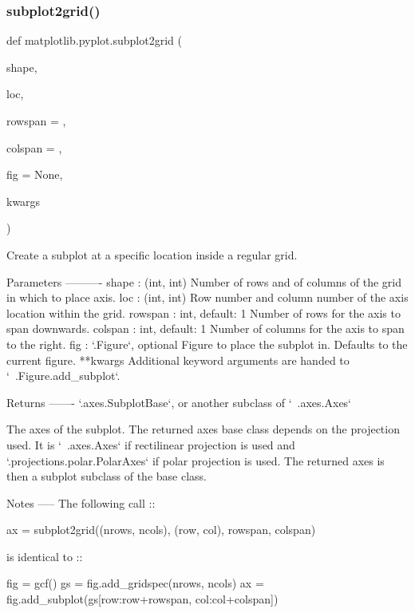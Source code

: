 \subsubsection{\texorpdfstring{subplot2grid()}{subplot2grid()}}
{\footnotesize\ttfamily def matplotlib.\+pyplot.\+subplot2grid (\begin{DoxyParamCaption}\item[{}]{shape,  }\item[{}]{loc,  }\item[{}]{rowspan = {},  }\item[{}]{colspan = {},  }\item[{}]{fig = {\ttfamily None},  }\item[{}]{kwargs }\end{DoxyParamCaption})}

\begin{DoxyVerb}Create a subplot at a specific location inside a regular grid.

Parameters
----------
shape : (int, int)
    Number of rows and of columns of the grid in which to place axis.
loc : (int, int)
    Row number and column number of the axis location within the grid.
rowspan : int, default: 1
    Number of rows for the axis to span downwards.
colspan : int, default: 1
    Number of columns for the axis to span to the right.
fig : `.Figure`, optional
    Figure to place the subplot in. Defaults to the current figure.
**kwargs
    Additional keyword arguments are handed to `~.Figure.add_subplot`.

Returns
-------
`.axes.SubplotBase`, or another subclass of `~.axes.Axes`

    The axes of the subplot.  The returned axes base class depends on the
    projection used.  It is `~.axes.Axes` if rectilinear projection is used
    and `.projections.polar.PolarAxes` if polar projection is used.  The
    returned axes is then a subplot subclass of the base class.

Notes
-----
The following call ::

    ax = subplot2grid((nrows, ncols), (row, col), rowspan, colspan)

is identical to ::

    fig = gcf()
    gs = fig.add_gridspec(nrows, ncols)
    ax = fig.add_subplot(gs[row:row+rowspan, col:col+colspan])
\end{DoxyVerb}
 \mbox{\label{namespacematplotlib_1_1pyplot_a17edd7c78e70ab40aac3e6aa0fba77e6}} 
